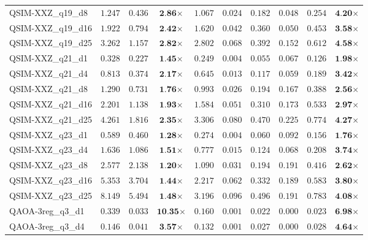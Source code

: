 \begin{table*}[t]
{\begin{tabular}{| l || r r c || r r r r r c |}
QSIM-XXZ\_q19\_d8 & $1.247$ & $0.436$ & $\textbf{2.86}$$\times$ & $1.067$ & $0.024$ & $0.182$ & $0.048$ & $0.254$ & $\textbf{4.20}$$\times$ \\
QSIM-XXZ\_q19\_d16 & $1.922$ & $0.794$ & $\textbf{2.42}$$\times$ & $1.620$ & $0.042$ & $0.360$ & $0.050$ & $0.453$ & $\textbf{3.58}$$\times$ \\
QSIM-XXZ\_q19\_d25 & $3.262$ & $1.157$ & $\textbf{2.82}$$\times$ & $2.802$ & $0.068$ & $0.392$ & $0.152$ & $0.612$ & $\textbf{4.58}$$\times$ \\
QSIM-XXZ\_q21\_d1 & $0.328$ & $0.227$ & $\textbf{1.45}$$\times$ & $0.249$ & $0.004$ & $0.055$ & $0.067$ & $0.126$ & $\textbf{1.98}$$\times$ \\
QSIM-XXZ\_q21\_d4 & $0.813$ & $0.374$ & $\textbf{2.17}$$\times$ & $0.645$ & $0.013$ & $0.117$ & $0.059$ & $0.189$ & $\textbf{3.42}$$\times$ \\
QSIM-XXZ\_q21\_d8 & $1.290$ & $0.731$ & $\textbf{1.76}$$\times$ & $0.993$ & $0.026$ & $0.194$ & $0.167$ & $0.388$ & $\textbf{2.56}$$\times$ \\
QSIM-XXZ\_q21\_d16 & $2.201$ & $1.138$ & $\textbf{1.93}$$\times$ & $1.584$ & $0.051$ & $0.310$ & $0.173$ & $0.533$ & $\textbf{2.97}$$\times$ \\
QSIM-XXZ\_q21\_d25 & $4.261$ & $1.816$ & $\textbf{2.35}$$\times$ & $3.306$ & $0.080$ & $0.470$ & $0.225$ & $0.774$ & $\textbf{4.27}$$\times$ \\
QSIM-XXZ\_q23\_d1 & $0.589$ & $0.460$ & $\textbf{1.28}$$\times$ & $0.274$ & $0.004$ & $0.060$ & $0.092$ & $0.156$ & $\textbf{1.76}$$\times$ \\
QSIM-XXZ\_q23\_d4 & $1.636$ & $1.086$ & $\textbf{1.51}$$\times$ & $0.777$ & $0.015$ & $0.124$ & $0.068$ & $0.208$ & $\textbf{3.74}$$\times$ \\
QSIM-XXZ\_q23\_d8 & $2.577$ & $2.138$ & $\textbf{1.20}$$\times$ & $1.090$ & $0.031$ & $0.194$ & $0.191$ & $0.416$ & $\textbf{2.62}$$\times$ \\
QSIM-XXZ\_q23\_d16 & $5.353$ & $3.704$ & $\textbf{1.44}$$\times$ & $2.217$ & $0.062$ & $0.332$ & $0.189$ & $0.583$ & $\textbf{3.80}$$\times$ \\
QSIM-XXZ\_q23\_d25 & $8.149$ & $5.494$ & $\textbf{1.48}$$\times$ & $3.196$ & $0.096$ & $0.496$ & $0.191$ & $0.783$ & $\textbf{4.08}$$\times$ \\
QAOA-3reg\_q3\_d1 & $0.339$ & $0.033$ & $\textbf{10.35}$$\times$ & $0.160$ & $0.001$ & $0.022$ & $0.000$ & $0.023$ & $\textbf{6.98}$$\times$ \\
QAOA-3reg\_q3\_d4 & $0.146$ & $0.041$ & $\textbf{3.57}$$\times$ & $0.132$ & $0.001$ & $0.027$ & $0.000$ & $0.028$ & $\textbf{4.64}$$\times$ \\

\end{tabular}}
\end{table*}
